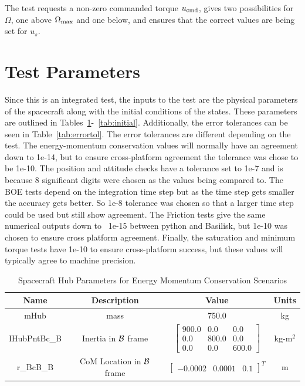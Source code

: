 The test requests a non-zero commanded torque $u_{\textnormal{cmd}}$, gives two possibilities for $\Omega$, one above $\Omega_{\textnormal{max}}$ and one below, and ensures that the correct values are being set for $u_s$.

\section{Test Parameters}

Since this is an integrated test, the inputs to the test are the physical parameters of the spacecraft along with the initial conditions of the states. These parameters are outlined in Tables~\ref{tab:hub}-~\ref{tab:initial}. Additionally, the error tolerances can be seen in Table~\ref{tab:errortol}. The error tolerances are different depending on the test. The energy-momentum conservation values will normally have an agreement down to 1e-14, but to ensure cross-platform agreement the tolerance was chose to be 1e-10. The position and attitude checks have a tolerance set to 1e-7 and is because 8 significant digits were chosen as the values being compared to. The BOE tests depend on the integration time step but as the time step gets smaller the accuracy gets better. So 1e-8 tolerance was chosen so that a larger time step could be used but still show agreement. The Friction tests give the same numerical outputs down to ~1e-15 between python and Basilisk, but 1e-10 was chosen to ensure cross platform agreement. Finally, the saturation and minimum torque tests have 1e-10 to ensure cross-platform success, but these values will typically agree to machine precision. 

\begin{table}[htbp]
	\caption{Spacecraft Hub Parameters for Energy Momentum Conservation Scenarios}
	\label{tab:hub}
	\centering \fontsize{10}{10}\selectfont
	\begin{tabular}{ c | c | c | c } %
		\hline
		\textbf{Name}  & \textbf{Description}  & \textbf{Value} & \textbf{Units} \\
		\hline
		mHub  & mass & 750.0 & kg \\
		IHubPntBc\_B & Inertia in $\cal{B}$ frame & $\begin{bmatrix}
		900.0 & 0.0 & 0.0\\
		0.0 & 800.0 & 0.0\\
		0.0 & 0.0 & 600.0
		\end{bmatrix}$ & kg-m$^2$ \\
		r\_BcB\_B & CoM Location in $\cal{B}$ frame & $\begin{bmatrix}
		-0.0002 & 0.0001 & 0.1 \end{bmatrix}^T$ & m \\
		\hline
	\end{tabular}
\end{table}

